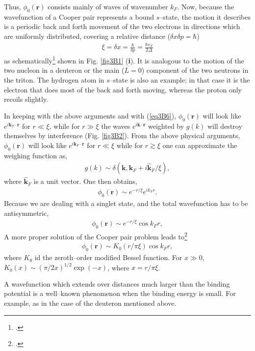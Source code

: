 \begin{subappendices}
Thus, $\phi_0(\mathbf r)$ consists mainly of waves of wavenumber $k_F$. Now, because the wavefunction of a Cooper pair represents a bound $s$--state, the motion it describes is a periodic back and forth movement of the two electrons in  directions which are uniformly distributed, covering a relative distance ($\delta x\delta p=\hbar$)
\begin{align}\label{eq3B6}
\xi=\delta x=\frac{\hbar}{\delta p}=\frac{\hbar v_F}{2\Delta}
\end{align}
as schematically\footnote{\cite{Weisskopf:81}.} shown in Fig. \ref{fig3B1} (\textbf{i}). It is analogous to the motion of the two nucleon in a deuteron or the main ($L=0$) component of the two neutrons in the triton. The hydrogen atom in $s$--state is also an example; in that case it is the electron that does most of the back and forth moving, whereas the proton only recoils slightly.

In keeping with the above arguments and with (\ref{eq3B6}), $\phi_0(\mathbf r)$ will look like $e^{i\mathbf k_F\cdot \mathbf r}$ for $r\ll\xi$, while for $r\gg \xi$ the waves $e^{i\mathbf k\cdot \mathbf r}$
weighted by $g(k)$ will destroy themselves by interference   (Fig. \ref{fig3B2}). From the above physical arguments, $\phi_0(\mathbf r)$ will look like $e^{i\mathbf k_F\cdot \mathbf r}$ for $r\ll\xi$ while for $r\gtrsim\xi$ one can approximate the weighing function as,
\begin{align}\label{eq3B7}
g(k)\sim\delta(\mathbf k,\mathbf k_F+i\mathbf{\hat k}_F/\xi),
\end{align}
where $\mathbf{\hat k}_F$ is a unit vector. One then obtains,
\begin{align}\label{eq3B8}
\phi_0(\mathbf r)\sim e^{-r/\xi}e^{ik_Fr}.
\end{align}
Because we are dealing with a singlet state, and the total wavefunction has to be antisymmetric,
\begin{align}\label{eq3B9}
\phi_0(\mathbf r)\sim e^{-r/\xi}\cos k_Fr,
\end{align}
 A more proper solution of the Cooper pair problem leads to\footnote{\cite{Kadin:07}.}
\begin{align}\label{eq3B10}
\phi_0(\mathbf r)\sim K_0(r/\pi\xi)\cos k_Fr,
\end{align}
where $K_0$ id the zeroth--order modified Bessel function. For $x\gg 0$, $K_0(x)\sim (\pi/2x)^{1/2}\exp(-x)$, where $x=r/\pi\xi$.

A wavefunction which extends over distances much larger than the binding potential is a well--known phenomenon when the binding energy is small. For example, as in the case of the deuteron mentioned above.  


\end{subappendices}

